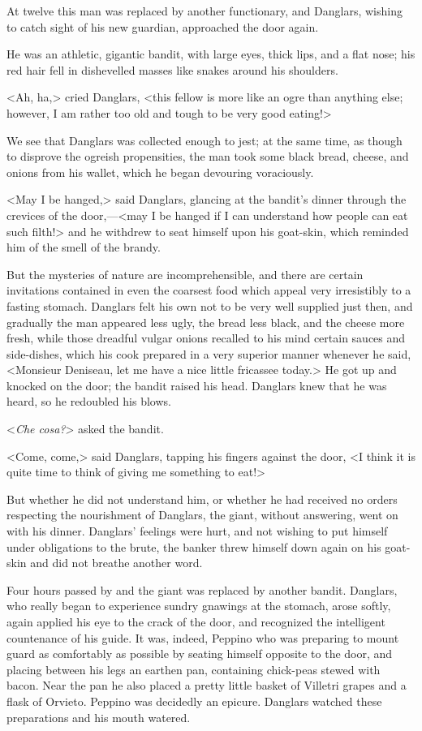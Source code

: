  At twelve this man was replaced by another functionary, and Danglars, wishing to catch sight of his new guardian, approached the door again. 

 He was an athletic, gigantic bandit, with large eyes, thick lips, and a flat nose; his red hair fell in dishevelled masses like snakes around his shoulders. 

 <Ah, ha,> cried Danglars, <this fellow is more like an ogre than anything else; however, I am rather too old and tough to be very good eating!> 

 We see that Danglars was collected enough to jest; at the same time, as though to disprove the ogreish propensities, the man took some black bread, cheese, and onions from his wallet, which he began devouring voraciously. 

 <May I be hanged,> said Danglars, glancing at the bandit's dinner through the crevices of the door,—<may I be hanged if I can understand how people can eat such filth!> and he withdrew to seat himself upon his goat-skin, which reminded him of the smell of the brandy. 

 But the mysteries of nature are incomprehensible, and there are certain invitations contained in even the coarsest food which appeal very irresistibly to a fasting stomach. Danglars felt his own not to be very well supplied just then, and gradually the man appeared less ugly, the bread less black, and the cheese more fresh, while those dreadful vulgar onions recalled to his mind certain sauces and side-dishes, which his cook prepared in a very superior manner whenever he said, <Monsieur Deniseau, let me have a nice little fricassee today.> He got up and knocked on the door; the bandit raised his head. Danglars knew that he was heard, so he redoubled his blows. 

 <\textit{Che cosa?}> asked the bandit. 

 <Come, come,> said Danglars, tapping his fingers against the door, <I think it is quite time to think of giving me something to eat!> 

 But whether he did not understand him, or whether he had received no orders respecting the nourishment of Danglars, the giant, without answering, went on with his dinner. Danglars' feelings were hurt, and not wishing to put himself under obligations to the brute, the banker threw himself down again on his goat-skin and did not breathe another word. 

 Four hours passed by and the giant was replaced by another bandit. Danglars, who really began to experience sundry gnawings at the stomach, arose softly, again applied his eye to the crack of the door, and recognized the intelligent countenance of his guide. It was, indeed, Peppino who was preparing to mount guard as comfortably as possible by seating himself opposite to the door, and placing between his legs an earthen pan, containing chick-peas stewed with bacon. Near the pan he also placed a pretty little basket of Villetri grapes and a flask of Orvieto. Peppino was decidedly an epicure. Danglars watched these preparations and his mouth watered. 

